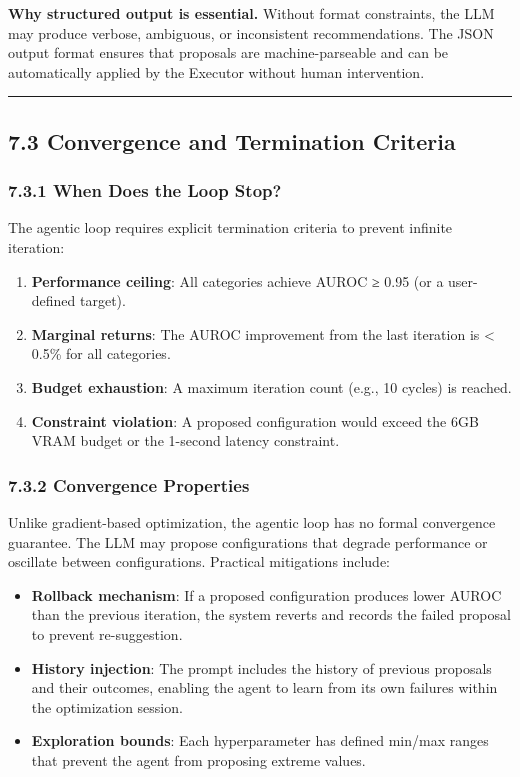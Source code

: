 \textbf{Why structured output is essential.} Without format constraints, the LLM may produce verbose, ambiguous, or inconsistent recommendations. The JSON output format ensures that proposals are machine-parseable and can be automatically applied by the Executor without human intervention.

\begin{center}\rule{0.5\linewidth}{0.5pt}\end{center}

\subsection{7.3 Convergence and Termination Criteria}\label{convergence-and-termination-criteria}

\subsubsection{7.3.1 When Does the Loop Stop?}\label{when-does-the-loop-stop}

The agentic loop requires explicit termination criteria to prevent infinite iteration:

\begin{enumerate}
\def\labelenumi{\arabic{enumi}.}
\tightlist
\item
  \textbf{Performance ceiling}: All categories achieve AUROC ≥ 0.95 (or a user-defined target).
\item
  \textbf{Marginal returns}: The AUROC improvement from the last iteration is \textless{} 0.5\% for all categories.
\item
  \textbf{Budget exhaustion}: A maximum iteration count (e.g., 10 cycles) is reached.
\item
  \textbf{Constraint violation}: A proposed configuration would exceed the 6GB VRAM budget or the 1-second latency constraint.
\end{enumerate}

\subsubsection{7.3.2 Convergence Properties}\label{convergence-properties}

Unlike gradient-based optimization, the agentic loop has no formal convergence guarantee. The LLM may propose configurations that degrade performance or oscillate between configurations. Practical mitigations include:

\begin{itemize}
\tightlist
\item
  \textbf{Rollback mechanism}: If a proposed configuration produces lower AUROC than the previous iteration, the system reverts and records the failed proposal to prevent re-suggestion.
\item
  \textbf{History injection}: The prompt includes the history of previous proposals and their outcomes, enabling the agent to learn from its own failures within the optimization session.
\item
  \textbf{Exploration bounds}: Each hyperparameter has defined min/max ranges that prevent the agent from proposing extreme values.
\end{itemize}

